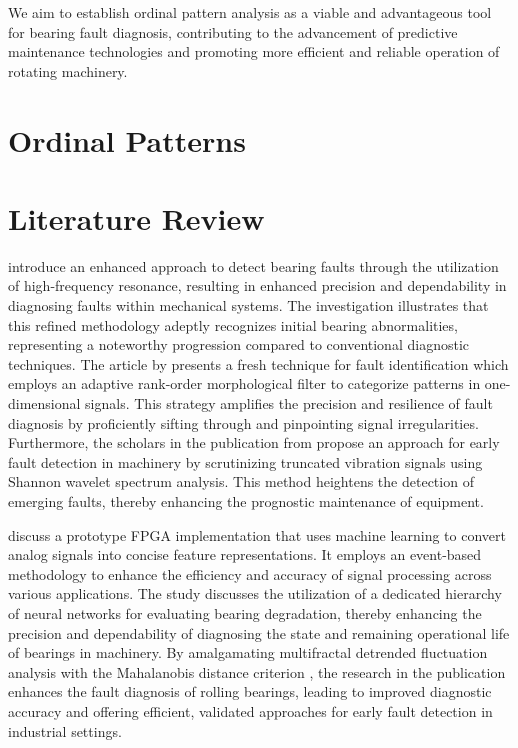 \documentclass[sn-basic,pdflatex]{sn-jnl}
\theoremstyle{remark}
\theoremstyle{definition}
\begin{document}
We aim to establish ordinal pattern analysis as a viable and
advantageous tool for bearing fault diagnosis, contributing to the
advancement of predictive maintenance technologies and promoting more
efficient and reliable operation of rotating machinery.

\section{Ordinal Patterns}\label{sec2}

\section{Literature Review}\label{sec3}

\citet{WOS:000312724900101} introduce an enhanced approach to detect
bearing faults through the utilization of high-frequency resonance,
resulting in enhanced precision and dependability in diagnosing faults
within mechanical systems. The investigation illustrates that this
refined methodology adeptly recognizes initial bearing abnormalities,
representing a noteworthy progression compared to conventional
diagnostic techniques. The article by \citep{WOS:000301688000008}
presents a fresh technique for fault identification which employs an
adaptive rank-order morphological filter to categorize patterns in
one-dimensional signals. This strategy amplifies the precision and
resilience of fault diagnosis by proficiently sifting through and
pinpointing signal irregularities. Furthermore, the scholars in the
publication from \citep{WOS:000303039300034} propose an approach for
early fault detection in machinery by scrutinizing truncated vibration
signals using Shannon wavelet spectrum analysis. This method heightens
the detection of emerging faults, thereby enhancing the prognostic
maintenance of equipment.

\citet{WOS:000345844100102} discuss a prototype FPGA implementation that
uses machine learning to convert analog signals into concise feature
representations. It employs an event-based methodology to enhance the
efficiency and accuracy of signal processing across various
applications. The \citep{WOS:000396580800080} study discusses the
utilization of a dedicated hierarchy of neural networks for evaluating
bearing degradation, thereby enhancing the precision and dependability
of diagnosing the state and remaining operational life of bearings in
machinery. By amalgamating multifractal detrended fluctuation analysis
with the Mahalanobis distance criterion \citep{WOS:000320835800016}, the
research in the publication enhances the fault diagnosis of rolling
bearings, leading to improved diagnostic accuracy and offering
efficient, validated approaches for early fault detection in industrial
settings.
\end{document}
